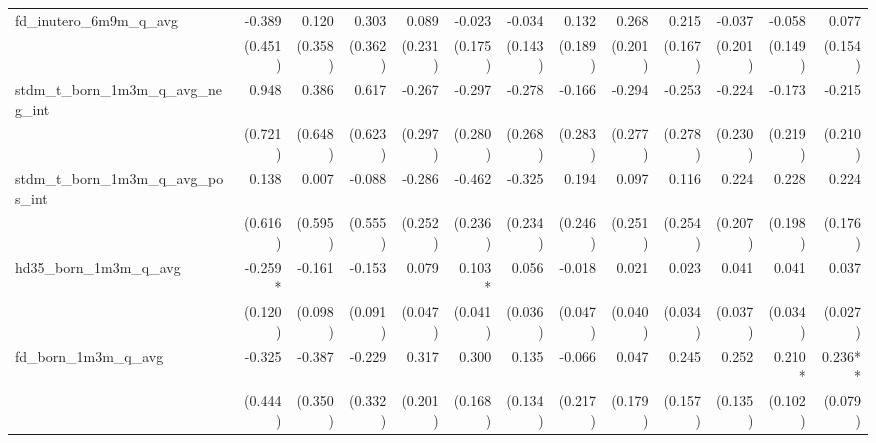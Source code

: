 \begin{tabular}{lrrrrrrrrrrrr}
fd\_inutero\_6m9m\_q\_avg                   &       -0.389 &        0.120 &        0.303 &        0.089 &       -0.023 &       -0.034 &        0.132 &        0.268 &        0.215 &       -0.037 &       -0.058 &        0.077 \\ 
                                            &      (0.451) &      (0.358) &      (0.362) &      (0.231) &      (0.175) &      (0.143) &      (0.189) &      (0.201) &      (0.167) &      (0.201) &      (0.149) &      (0.154) \\ 
stdm\_t\_born\_1m3m\_q\_avg\_neg\_int       &        0.948 &        0.386 &        0.617 &       -0.267 &       -0.297 &       -0.278 &       -0.166 &       -0.294 &       -0.253 &       -0.224 &       -0.173 &       -0.215 \\ 
                                            &      (0.721) &      (0.648) &      (0.623) &      (0.297) &      (0.280) &      (0.268) &      (0.283) &      (0.277) &      (0.278) &      (0.230) &      (0.219) &      (0.210) \\ 
stdm\_t\_born\_1m3m\_q\_avg\_pos\_int       &        0.138 &        0.007 &       -0.088 &       -0.286 &       -0.462 &       -0.325 &        0.194 &        0.097 &        0.116 &        0.224 &        0.228 &        0.224 \\ 
                                            &      (0.616) &      (0.595) &      (0.555) &      (0.252) &      (0.236) &      (0.234) &      (0.246) &      (0.251) &      (0.254) &      (0.207) &      (0.198) &      (0.176) \\ 
hd35\_born\_1m3m\_q\_avg                    &      -0.259* &       -0.161 &       -0.153 &        0.079 &       0.103* &        0.056 &       -0.018 &        0.021 &        0.023 &        0.041 &        0.041 &        0.037 \\ 
                                            &      (0.120) &      (0.098) &      (0.091) &      (0.047) &      (0.041) &      (0.036) &      (0.047) &      (0.040) &      (0.034) &      (0.037) &      (0.034) &      (0.027) \\ 
fd\_born\_1m3m\_q\_avg                      &       -0.325 &       -0.387 &       -0.229 &        0.317 &        0.300 &        0.135 &       -0.066 &        0.047 &        0.245 &        0.252 &       0.210* &      0.236** \\ 
                                            &      (0.444) &      (0.350) &      (0.332) &      (0.201) &      (0.168) &      (0.134) &      (0.217) &      (0.179) &      (0.157) &      (0.135) &      (0.102) &      (0.079) \\ 

\end{tabular}
